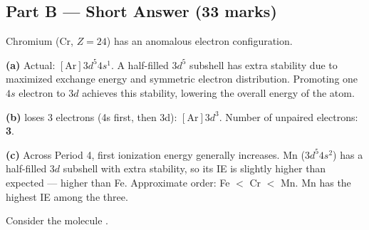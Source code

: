 \documentclass[addpoints]{exam}
\begin{document}
\begin{questions}
\section*{Part B --- Short Answer (33 marks)}

\question Chromium (Cr, $Z = 24$) has an anomalous electron configuration.
\begin{solution}[9cm]
\textbf{(a)} Actual: $[\text{Ar}]3d^5 4s^1$. A half-filled $3d^5$ subshell has extra stability due
to maximized exchange energy and symmetric electron distribution. Promoting one $4s$ electron to
$3d$ achieves this stability, lowering the overall energy of the atom.

\textbf{(b)}  loses 3 electrons (4s first, then 3d): $[\text{Ar}]3d^3$.
Number of unpaired electrons: \textbf{3}.

\textbf{(c)} Across Period 4, first ionization energy generally increases. Mn ($3d^5 4s^2$) has a
half-filled $3d$ subshell with extra stability, so its IE is slightly higher than expected --- higher
than Fe. Approximate order: Fe $<$ Cr $<$ Mn. Mn has the highest IE among the three.
\end{solution}

\question Consider the molecule .
\end{questions}
\end{document}
